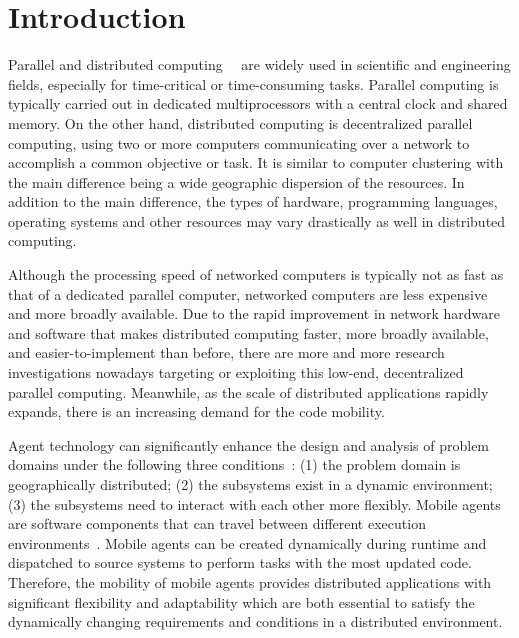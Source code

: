 \documentclass[11pt]{report}
\begin{document}
\setcounter{page}{1}
\pagebreak

\chapter{Introduction}
Parallel and distributed computing~\cite{Kumar}~\cite{Manber} are widely used 
in scientific and engineering fields, especially for time-critical or 
time-consuming tasks.
Parallel computing is typically carried out in dedicated multiprocessors with
a central clock and shared memory.
On the other hand, distributed computing is decentralized parallel
computing, using two or more computers communicating over a network to
accomplish a common objective or task.
It is similar to computer clustering with the main difference being a wide
geographic dispersion of the resources.
In addition to the main difference, the types of hardware, programming 
languages, operating systems and other resources may vary drastically as well 
in distributed computing.

Although the processing speed of networked computers is typically not as fast 
as that of a dedicated parallel computer, networked computers are less
expensive and more broadly available.
Due to the rapid improvement in network hardware and software that makes
distributed computing faster, more broadly available, and easier-to-implement
than before, there are more and more research investigations nowadays 
targeting or exploiting this low-end, decentralized parallel computing.
Meanwhile, as the scale of distributed applications rapidly expands, 
there is an increasing demand for the code mobility.

Agent technology can significantly enhance the design and analysis of 
problem domains under the following three conditions~\cite{Adler}: 
(1) the problem domain is geographically distributed; 
(2) the subsystems exist in a dynamic environment; 
(3) the subsystems need to interact with each other more flexibly. 
Mobile agents are software components that can travel between 
different execution environments~\cite{Fuggetta}. 
Mobile agents can be created dynamically during runtime and dispatched to 
source systems to perform tasks with the most updated code. 
Therefore, the mobility of mobile agents provides distributed 
applications with significant flexibility and adaptability which are both 
essential to satisfy the dynamically changing requirements and conditions in 
a distributed environment.
\end{document}
